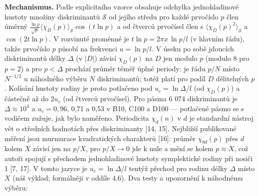\documentclass[
  10pt,
]{article}
\begin{document}
\textbf{Mechanismus.} Podle explicitního vzorce obsahuje odchylka
jednohladinové hustoty množiny diskriminantů \(\mathcal S\) od jejího
středu pro každé prvočíslo \(p\) člen úměrný
\(\frac{\ln p}{\sqrt p}\langle\chi_D(p)\rangle_{\mathcal S}\cos(t\ln p)\)
a od čtverců prvočísel člen s \(\langle\chi_D(p)^2\rangle_{\mathcal S}\)
a \(\cos(2t\ln p)\). V rozvinuté proměnné je
\(t\ln p = 2\pi x\,\ln p/l\) (v hlavním řádu), takže prvočíslo \(p\)
působí na frekvenci \(u = \ln p/l\). V úseku po sobě jdoucích
diskriminantů délky \(\Delta\) (v \(|D|\)) závisí \(\chi_D(p)\) na \(D\)
jen modulo \(p\) (modulo 8 pro \(p = 2\)) a pro \(p < \Delta\) prochází
průměr téměř úplné periody: je řádu \(p/N\) místo \(N^{-1/2}\) u
náhodného výběru \(N\) diskriminantů; totéž platí pro podíl \(D\)
dělitelných \(p\). Kolísání hustoty rodiny je proto potlačeno pod
\(u_c = \ln\Delta/l\) (od \(\chi_D(p)\)) a částečně až do \(2u_c\) (od
čtverců prvočísel). Pro pásma 6 074 diskriminantů je
\(\Delta \approx 10^4\) a \(u_c = 0{,}96\), 0,71 a 0,53 v B10, C100 a
D100 --- potlačené pásmo se s vodičem zužuje, jak bylo naměřeno.
Periodicita \(\chi_d(n)\) v \(d\) je standardní nástroj vět o středních
hodnotách přes diskriminanty {[}14, 15{]}. Nejbližší publikované měření
jsou murmurace kvadratických charakterů {[}16{]}: průměr
\(\chi_{8d}(p)\) přes \(d\) kolem \(X\) závisí jen na \(p/X\), pro
\(p/X \to 0\) jde k nule a mění se kolem \(p \approx X\), což autoři
spojují s přechodem jednohladinové hustoty symplektické rodiny při
nosiči 1 {[}7, 17{]}. V tomto jazyce je \(u_c = \ln\Delta/l\) tentýž
přechod pro rodinu délky \(\Delta\) místo \(X\) (náš výklad; formálněji
v oddíle 4.6). Dva testy a upozornění k náhodnému výběru:
\end{document}

